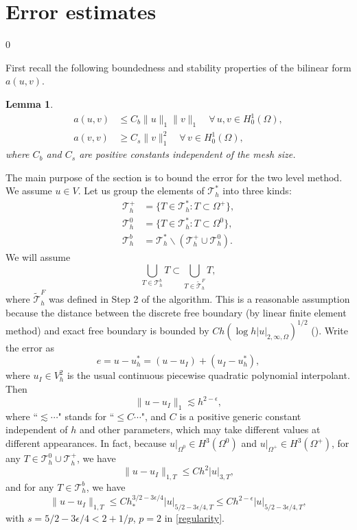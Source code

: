\documentclass[12pt]{article}
\newtheorem{lemma}[theorem]{Lemma}
\begin{document}
\section{Error estimates}\label{sec:est}
\setcounter{equation}0

First recall the following boundedness and stability properties of the bilinear form $a(u,v)$.

\begin{lemma}
\begin{align}\label{bound}
a(u,v)&\leq C_b  \|u\|_1\| v\|_1\quad\forall\, u,v \in H^1_0(\Omega),\\
a(v,v)&\geq C_s \|v\|_1^2 \quad \forall\, v \in H^1_0(\Omega),
\label{stable}
\end{align}
where $C_b$ and $C_s$ are positive constants independent of the mesh size.
\end{lemma}


The main purpose of the section is to bound the error for the two level method. 
We assume $u\in V$.  Let us group the elements of $\mathcal{T}_h^*$ into three kinds:
\begin{align*}
  \mathcal{T}_h^+ &= \{T\in \mathcal{T}_h^*: T \subset \Omega^+\}, \\
  \mathcal{T}_h^0 &= \{T\in \mathcal{T}_h^*: T \subset \Omega^0\}, \\
  \mathcal{T}_h^b &= \mathcal{T}_h^* \backslash(\mathcal{T}_h^+\cup\mathcal{T}_h^0).
\end{align*}
 {\color{red} We will assume 
\begin{equation}
 \bigcup_{T\in \mathcal{T}_h^b} T\subset \bigcup_{T\in\tilde{\mathcal{T}}_h^F} T,
\label{assumpT}
\end{equation}
where $\tilde{\mathcal{T}}_h^F$ was defined in Step 2 of the algorithm.
This is a reasonable assumption because the distance between the discrete free boundary (by linear finite element method) and exact free boundary is bounded by $C h (\log h |u|_{2,\infty,\Omega})^{1/2}$ (\cite{nochetto15}).}
Write the error as
\[e = u - u_h^* = (u - u_I) + (u_I - u_h^*),\]
where $u_I \in V_h^2$ is the usual continuous piecewise quadratic polynomial
interpolant.   Then
\begin{equation}\label{gappro}
\|u-u_I\|_1  \lesssim h^{2-\epsilon},
\end{equation}
where ``$\lesssim\cdots $" stands for ``$\leq C\cdots $", and $C$
is a positive generic constant independent of $h$ and other
parameters, which may take different values at different appearances.
In fact, because $u|_{\Omega^0}\in H^3(\Omega^0)$ and $u|_{\Omega^+}\in H^3(\Omega^+)$, 
for any $T\in \mathcal{T}_h^0\cup\mathcal{T}_h^+$, we have 
\[\|u-u_I\|_{1,T} \leq C h^2 |u|_{3,T},\] 
and for any $T\in \mathcal{T}_h^b$, we have 
\[\|u-u_I\|_{1,T} \leq C h_*^{3/2-3\epsilon/4} |u|_{5/2-3\epsilon/4,T}
 \leq C h^{2-\epsilon} |u|_{5/2-3\epsilon/4,T},\]
with $s=5/2-3\epsilon/4<2+1/p$, $p=2$ in \eqref{regularity}.
\end{document}
